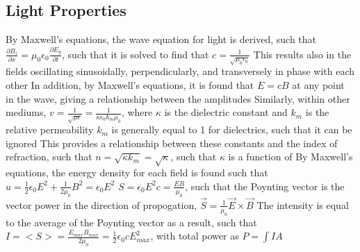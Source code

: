 \documentclass[11 pt, twoside]{article}
\newenvironment{outline*}
{
	\begin{outline}[enumerate]
	}
	{\end{outline}
}
\begin{document}
\subsection{Light Properties}
\begin{outline*}
\1 By Maxwell's equations, the wave equation for light is derived, such that $\frac{\partial B_z}{\partial x} = \mu_0\epsilon_0 \frac{\partial E_y}{\partial t}$, such that it is solved to find that $c = \frac{1}{\sqrt{\mu_0\epsilon_0}}$
\2 This results also in the fields oscillating sinusoidally, perpendicularly, and transversely in phase with each other
\2 In addition, by Maxwell's equations, it is found that $E = cB$ at any point in the wave, giving a relationship between the amplitudes
\2 Similarly, within other mediums, $v = \frac{1}{\sqrt{\mu\epsilon}} = \frac{1}{\kappa\epsilon_0 k_m\mu_0}$, where $\kappa$ is the dielectric constant and $k_m$ is the relative permeability
\3 $k_m$ is generally equal to 1 for dielectrics, such that it can be ignored
\3 This provides a relationship between these constants and the index of refraction, such that $n = \sqrt{\kappa k_m} = \sqrt{\kappa}$, such that $\kappa$ is a function of 
\1 By Maxwell's equations, the energy density for each field is found such that $u = \frac{1}{2}\epsilon_0E^2 + \frac{1}{2\mu_0}B^2 = \epsilon_0E^2$
\2 $S = \epsilon_0E^2c = \frac{EB}{\mu_0}$, such that the Poynting vector is the vector power in the direction of propogation, $\vec{S} = \frac{1}{\mu_0}\vec{E}\times\vec{B}$
\2 The intensity is equal to the average of the Poynting vector as a result, such that $I = <S> = \frac{E_{max}B_{max}}{2\mu_0} = \frac{1}{2}\epsilon_0cE_{max}^2$, with total power as $P = \int IA$
\end{outline*}
\end{document}
